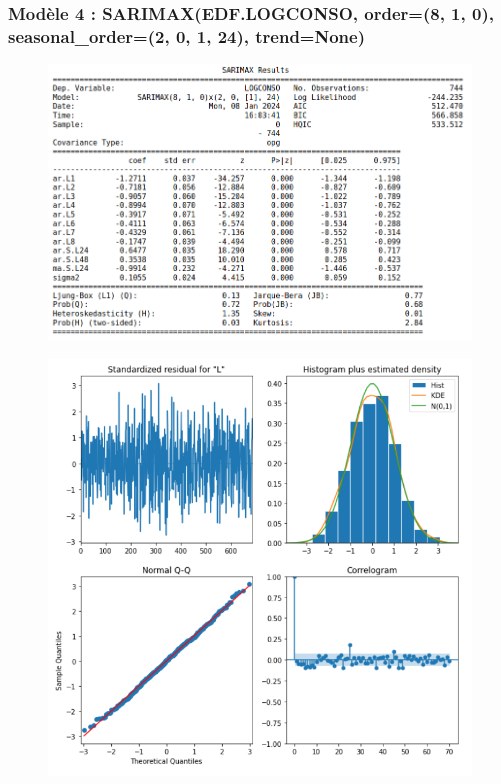 \documentclass{beamer}
\theoremstyle{definition}
\begin{document}
\begin{frame}
	\frametitle{Modèle 4 : SARIMAX(EDF.LOGCONSO, order=(8, 1, 0), seasonal\_order=(2, 0, 1, 24), trend=None)}
	\begin{minipage}[t]{1\linewidth}
		\centering
		\begin{minipage}[c]{0.55\linewidth}\centering\begin{figure}
				\centering
				\includegraphics[width=1\linewidth]{22.png}	
		\end{figure}\end{minipage}\hfill 
		\begin{minipage}[c]{0.44\linewidth}\centering\begin{figure}
				\begin{center}
					\includegraphics[width=1\linewidth]{23.png}			
				\end{center}
				
		\end{figure}\end{minipage}
	\end{minipage}	
\end{frame}
\end{document}

